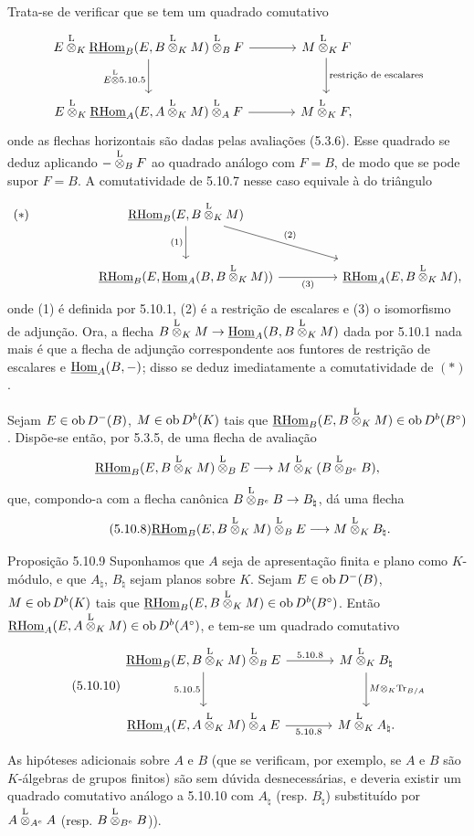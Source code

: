 Trata-se de verificar que se tem um quadrado comutativo
\[
\begin{tikzcd}[column sep=large,row sep=large]
E\lten_K\uRHom_B(E,B\lten_KM)\lten_BF \arrow[r] \arrow[d,"E\lten5.10.5"'] & M\lten_KF \arrow[d,"\text{restrição de escalares}"]\\
E\lten_K\uRHom_A(E,A\lten_KM)\lten_AF \arrow[r] & M\lten_KF,
\end{tikzcd}
\]
onde as flechas horizontais são dadas pelas avaliações (5.3.6). Esse quadrado se deduz aplicando $-\overset{\mathrm L}{\otimes}_BF$ ao quadrado análogo com $F=B$, de modo que se pode supor $F=B$. A comutatividade de 5.10.7 nesse caso equivale à do triângulo
\[
\begin{tikzcd}[column sep=huge,row sep=large]
|[alias=star]| {(*)} & \uRHom_B(E,B\lten_KM) \arrow[d,"(1)"'] \arrow[dr,"(2)"] & \\
& \uRHom_B(E,\uHom_A(B,B\lten_KM)) \arrow[r,"(3)"'] & \uRHom_A(E,B\lten_KM),
\end{tikzcd}
\]
onde (1) é definida por 5.10.1, (2) é a restrição de escalares e (3) o isomorfismo de adjunção. Ora, a flecha $B\overset{\mathrm L}{\otimes}_KM\to\underline{\operatorname{Hom}}_A(B,B\overset{\mathrm L}{\otimes}_KM)$ dada por 5.10.1 nada mais é que a flecha de adjunção correspondente aos funtores de restrição de escalares e $\underline{\operatorname{Hom}}_A(B,-)$; disso se deduz imediatamente a comutatividade de $(*)$.

Sejam $E\in\operatorname{ob} D^-(B)$, $M\in\operatorname{ob} D^b(K)$ tais que $\underline{\mathrm{RHom}}_B(E,B\overset{\mathrm L}{\otimes}_KM)\in\operatorname{ob} D^b(B^\circ)$. Dispõe-se então, por 5.3.5, de uma flecha de avaliação
\[
\underline{\mathrm{RHom}}_B(E,B\overset{\mathrm L}{\otimes}_KM)\overset{\mathrm L}{\otimes}_BE\longrightarrow M\overset{\mathrm L}{\otimes}_K(B\overset{\mathrm L}{\otimes}_{B^e}B),
\]
que, compondo-a com a flecha canônica $B\overset{\mathrm L}{\otimes}_{B^e}B\to B_\natural$, dá uma flecha
\begin{equation}\tag{5.10.8}
\underline{\mathrm{RHom}}_B(E,B\overset{\mathrm L}{\otimes}_KM)\overset{\mathrm L}{\otimes}_BE\longrightarrow M\overset{\mathrm L}{\otimes}_KB_\natural.
\end{equation}

\begin{statement}{Proposição 5.10.9}
Suponhamos que $A$ seja de apresentação finita e plano como $K$-módulo, e que $A_\natural$, $B_\natural$ sejam planos sobre $K$. Sejam $E\in\operatorname{ob} D^-(B)$, $M\in\operatorname{ob} D^b(K)$ tais que $\underline{\mathrm{RHom}}_B(E,B\overset{\mathrm L}{\otimes}_KM)\in\operatorname{ob} D^b(B^\circ)$. Então $\underline{\mathrm{RHom}}_A(E,A\overset{\mathrm L}{\otimes}_KM)\in\operatorname{ob} D^b(A^\circ)$, e tem-se um quadrado comutativo
\begin{equation}\tag{5.10.10}
\begin{tikzcd}[column sep=large,row sep=large]
\uRHom_B(E,B\lten_KM)\lten_BE \arrow[r,"5.10.8"] \arrow[d,"5.10.5"'] & M\lten_KB_\natural \arrow[d,"M\otimes_K\Tr_{B/A}"]\\
\uRHom_A(E,A\lten_KM)\lten_AE \arrow[r,"5.10.8"'] & M\lten_KA_\natural .
\end{tikzcd}
\end{equation}
\end{statement}

As hipóteses adicionais sobre $A$ e $B$ (que se verificam, por exemplo, se $A$ e $B$ são $K$-álgebras de grupos finitos) são sem dúvida desnecessárias, e deveria existir um quadrado comutativo análogo a 5.10.10 com $A_\natural$ (resp. $B_\natural$) substituído por $A\overset{\mathrm L}{\otimes}_{A^e}A$ (resp. $B\overset{\mathrm L}{\otimes}_{B^e}B$)).
